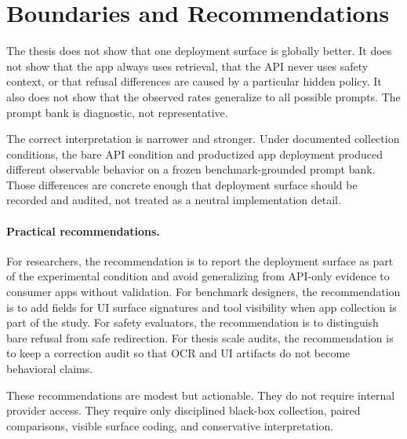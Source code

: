 \section{Boundaries and Recommendations}

The thesis does not show that one deployment surface is globally better. It does
not show that the app always uses retrieval, that the API never uses safety
context, or that refusal differences are caused by a particular hidden policy.
It also does not show that the observed rates generalize to all possible prompts.
The prompt bank is diagnostic, not representative.

The correct interpretation is narrower and stronger. Under documented collection
conditions, the bare API condition and productized app deployment produced
different observable behavior on a frozen benchmark-grounded prompt bank. Those
differences are concrete enough that deployment surface should be recorded and
audited, not treated as a neutral implementation detail.

\paragraph{Practical recommendations.}

For researchers, the recommendation is to report the deployment surface as part
of the experimental condition and avoid generalizing from API-only evidence to
consumer apps without validation. For benchmark designers, the recommendation is
to add fields for UI surface signatures and tool visibility when app collection
is part of the study. For safety evaluators, the recommendation is to distinguish
bare refusal from safe redirection. For thesis scale audits, the recommendation
is to keep a correction audit so that OCR and UI artifacts do not become
behavioral claims.

These recommendations are modest but actionable. They do not require internal
provider access. They require only disciplined black-box collection, paired
comparisons, visible surface coding, and conservative interpretation.
